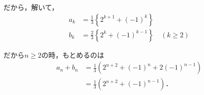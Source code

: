 \documentclass[../main.tex]{subfiles}
\begin{document}
だから，解いて，
\begin{align*}
  a_k&=\frac13\left\{2^{k+1}+(-1)^k\right\}\\
  b_k&=\frac23\left\{2^k+(-1)^{k-1}\right\}\quad(k\ge2)
\end{align*}

だから$n\ge2$の時，もとめるのは
\begin{align*}
  a_n+b_n&=\frac13\left(2^{n+2}+(-1)^n+2(-1)^{n-1}\right)\\
  &=\frac13\left(2^{n+2}+(-1)^{n-1}\right)．
\end{align*}

\newpage
\end{document}

